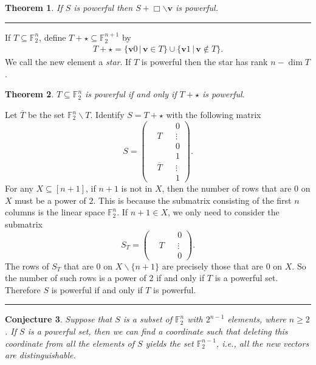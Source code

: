 \documentclass[12pt]{article}
\newtheorem{thm}{Theorem}[section]
\newtheorem{con}[thm]{Conjecture}
\def\pf{\noindent {\it Proof.\ }}
\def\qed{\hfill \rule{4pt}{7pt}}
\begin{document}
\begin{thm}
If $S$ is powerful then $S+\Box\backslash\mathbf{v}$ is powerful.
\qed
\end{thm}

If $T\subseteq\mathbb{F}_2^n$,
define $T+\star\subseteq\mathbb{F}_2^{n+1}$ by
\begin{align*}
T+\star=\{\mathbf{v}0\,|\,\mathbf{v}\in T\}\cup\{\mathbf{v}1\,|\,\mathbf{v}\notin T\}.
\end{align*}
We call the new element a \textit{star}.  If $T$ is powerful then the star has rank $n-\dim T$.

\begin{thm}\label{thmcon}
$T\subseteq\mathbb{F}_2^n$ is powerful if and only if $T+\star$ is powerful.
\end{thm}

\pf Let $\overline{T}$ be the set $\mathbb{F}_2^n\backslash T$.  Identify $S=T+\star$ with the following matrix
\begin{equation*}
S=\left(
\begin{array}{ccc|c}
{} &{} &{} &0\\
{} &T &{} &\vdots\\
{} &{} &{} &0\\\hline
{} &{} &{} &1\\
{} &\overline{T} &{} &\vdots\\
{} &{} &{} &1
\end{array}
\right).
\end{equation*}
For any $X\subseteq[n+1]$, if $n+1$ is not in $X$, then the number of rows that are 0
on $X$ must be a power of $2$. This is because the submatrix consisting of the first $n$ columns is the linear space $\mathbb{F}_2^n$. If $n+1\in X$, we only need to consider the submatrix
\begin{equation*}
S_T=\left(
\begin{array}{ccc|c}
{} &{} &{} &0\\
{} &T &{} &\vdots\\
{} &{} &{} &0
\end{array}
\right).
\end{equation*}
The rows of $S_T$ that are 0 on $X\backslash\{n+1\}$ are precisely those that are 0 on $X$. So the number of such rows is a power of 2 if and only if $T$ is a powerful set. Therefore $S$ is powerful if and only if $T$ is powerful. \qed

\begin{con}\label{conj}
Suppose that $S$ is a subset of $\mathbb{F}_2^n$ with $2^{n-1}$ elements, where $n\geq2$. If $S$ is a powerful set, then we can find a coordinate such that deleting this coordinate from all the elements of $S$ yields the set $\mathbb{F}_2^{n-1}$, i.e., all the new vectors are distinguishable.
\end{con}
\end{document}
